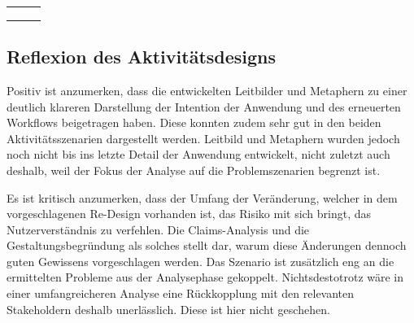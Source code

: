 \documentclass[
  12pt,
  ngerman,
  a4paper,
]{article}
\begin{document}
\begin{longtable}[]{@{}lll@{}}
\begin{minipage}[t]{0.22\columnwidth}
\strut
\end{minipage} & \begin{minipage}[t]{0.35\columnwidth}\raggedright
\strut
\end{minipage}\tabularnewline
\begin{minipage}[t]{0.35\columnwidth}\raggedright
\strut
\end{minipage} & \begin{minipage}[t]{0.22\columnwidth}\raggedright
\strut
\end{minipage} & \begin{minipage}[t]{0.35\columnwidth}\raggedright
\strut
\end{minipage}\tabularnewline
\begin{minipage}[t]{0.35\columnwidth}\raggedright
\strut
\end{minipage} & \begin{minipage}[t]{0.22\columnwidth}\raggedright
\strut
\end{minipage} & \begin{minipage}[t]{0.35\columnwidth}\raggedright
\strut
\end{minipage}\tabularnewline
\bottomrule
\end{longtable}

\hypertarget{reflexion-des-aktivituxe4tsdesigns}{%
\subsection{Reflexion des
Aktivitätsdesigns}\label{reflexion-des-aktivituxe4tsdesigns}}

Positiv ist anzumerken, dass die entwickelten Leitbilder und Metaphern
zu einer deutlich klareren Darstellung der Intention der Anwendung und
des erneuerten Workflows beigetragen haben. Diese konnten zudem sehr gut
in den beiden Aktivitätsszenarien dargestellt werden. Leitbild und
Metaphern wurden jedoch noch nicht bis ins letzte Detail der Anwendung
entwickelt, nicht zuletzt auch deshalb, weil der Fokus der Analyse auf
die Problemszenarien begrenzt ist.

Es ist kritisch anzumerken, dass der Umfang der Veränderung, welcher in
dem vorgeschlagenen Re-Design vorhanden ist, das Risiko mit sich bringt,
das Nutzerverständnis zu verfehlen. Die Claims-Analysis und die
Gestaltungsbegründung als solches stellt dar, warum diese Änderungen
dennoch guten Gewissens vorgeschlagen werden. Das Szenario ist
zusätzlich eng an die ermittelten Probleme aus der Analysephase
gekoppelt. Nichtsdestotrotz wäre in einer umfangreicheren Analyse eine
Rückkopplung mit den relevanten Stakeholdern deshalb unerlässlich. Diese
ist hier nicht geschehen.
\end{document}
